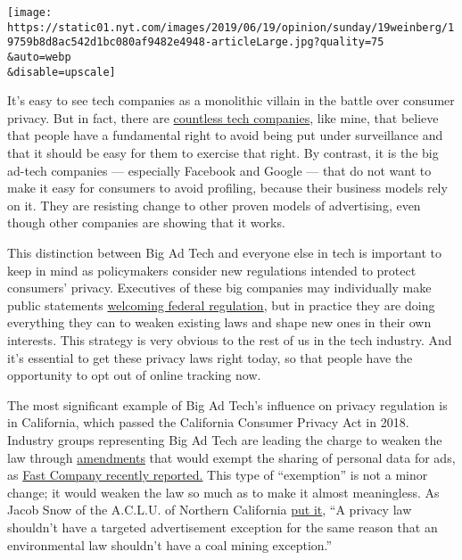 \texttt{[image: https://static01.nyt.com/images/2019/06/19/opinion/sunday/19weinberg/19759b8d8ac542d1bc080af9482e4948-articleLarge.jpg?quality=75\\\&auto=webp\\\&disable=upscale]}

It's easy to see tech companies as a monolithic villain in the battle
over consumer privacy. But in fact, there are
\href{https://spreadprivacy.com/ccpa-privacy-for-all-act/}{countless
tech companies}, like mine, that believe that people have a fundamental
right to avoid being put under surveillance and that it should be easy
for them to exercise that right. By contrast, it is the big ad-tech
companies --- especially Facebook and Google --- that do not want to
make it easy for consumers to avoid profiling, because their business
models rely on it. They are resisting change to other proven models of
advertising, even though other companies are showing that it works.

This distinction between Big Ad Tech and everyone else in tech is
important to keep in mind as policymakers consider new regulations
intended to protect consumers' privacy. Executives of these big
companies may individually make public statements
\href{https://www.washingtonpost.com/opinions/mark-zuckerberg-the-internet-needs-new-rules-lets-start-in-these-four-areas/2019/03/29/9e6f0504-521a-11e9-a3f7-78b7525a8d5f_story.html?utm_term=.0a706aa010da}{welcoming
federal regulation}, but in practice they are doing everything they can
to weaken existing laws and shape new ones in their own interests. This
strategy is very obvious to the rest of us in the tech industry. And
it's essential to get these privacy laws right today, so that people
have the opportunity to opt out of online tracking now.

The most significant example of Big Ad Tech's influence on privacy
regulation is in California, which passed the California Consumer
Privacy Act in 2018. Industry groups representing Big Ad Tech are
leading the charge to weaken the law through
\href{https://leginfo.legislature.ca.gov/faces/billTextClient.xhtml?bill_id=201920200SB753}{amendments}
that would exempt the sharing of personal data for ads, as
\href{https://www.fastcompany.com/90338036/how-big-tech-is-trying-to-shape-californias-landmark-privacy-law}{Fast
Company recently reported.} This type of ``exemption'' is not a minor
change; it would weaken the law so much as to make it almost
meaningless. As Jacob Snow of the A.C.L.U. of Northern California
\href{https://www.fastcompany.com/90338036/how-big-tech-is-trying-to-shape-californias-landmark-privacy-law}{put
it}, ``A privacy law shouldn't have a targeted advertisement exception
for the same reason that an environmental law shouldn't have a coal
mining exception.''

